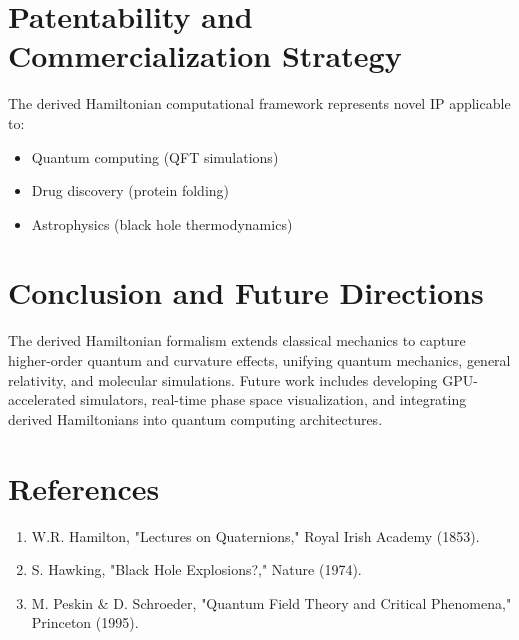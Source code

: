 \documentclass{article}
\begin{document}
\section{Patentability and Commercialization Strategy}
The derived Hamiltonian computational framework represents novel IP applicable to:
\begin{itemize}
    \item Quantum computing (QFT simulations)
    \item Drug discovery (protein folding)
    \item Astrophysics (black hole thermodynamics)
\end{itemize}

\section{Conclusion and Future Directions}
The derived Hamiltonian formalism extends classical mechanics to capture higher-order quantum and curvature effects, unifying quantum mechanics, general relativity, and molecular simulations. Future work includes developing GPU-accelerated simulators, real-time phase space visualization, and integrating derived Hamiltonians into quantum computing architectures.

\section*{References}
\begin{enumerate}
    \item W.R. Hamilton, "Lectures on Quaternions," Royal Irish Academy (1853).
    \item S. Hawking, "Black Hole Explosions?," Nature (1974).
    \item M. Peskin \& D. Schroeder, "Quantum Field Theory and Critical Phenomena," Princeton (1995).
\end{enumerate}
\end{document}
